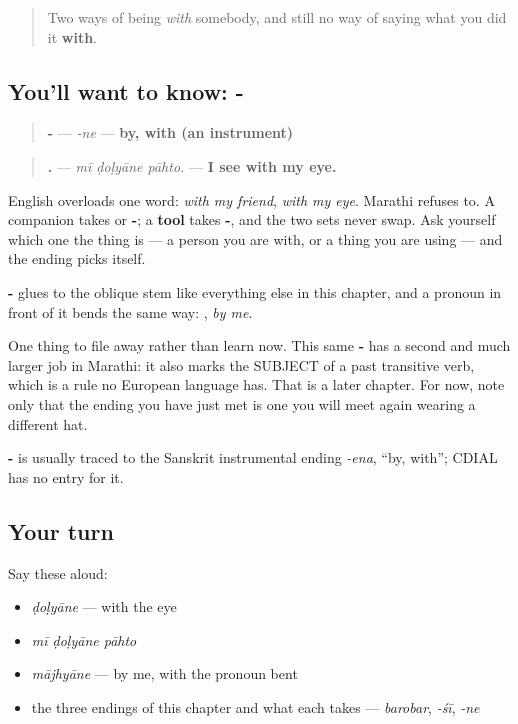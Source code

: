 \label{lesson:MR-C45-ne}



\begin{quote}
Two ways of being \emph{with} somebody, and still no way of saying what you did it \textbf{with}.
\end{quote}

\subsection*{You'll want to know: -}
\begin{quote}
\textbf{-} — \emph{-ne} — \textbf{by, with (an instrument)}
\end{quote}

\begin{quote}
\textbf{  .} — \emph{mī ḍoḷyāne pāhto.} — \textbf{I see with my eye.}
\end{quote}

English overloads one word: \emph{with my friend}, \emph{with my eye}. Marathi refuses to. A companion takes \textbf{} or \textbf{-}; a \textbf{tool} takes \textbf{-}, and the two sets never swap. Ask yourself which one the thing is — a person you are with, or a thing you are using — and the ending picks itself.

\textbf{-} glues to the oblique stem like everything else in this chapter, and a pronoun in front of it bends the same way: \textbf{}, \emph{by me}.

One thing to file away rather than learn now. This same \textbf{-} has a second and much larger job in Marathi: it also marks the SUBJECT of a past transitive verb, which is a rule no European language has. That is a later chapter. For now, note only that the ending you have just met is one you will meet again wearing a different hat.

\begin{cousinweb}
\textbf{-} is usually traced to the Sanskrit instrumental ending \emph{-ena}, \textquotedblleft{}by, with\textquotedblright{}; CDIAL has no entry for it.
\end{cousinweb}

\subsection*{Your turn}
Say these aloud:

\begin{itemize}
\raggedright
  \item \emph{ḍoḷyāne} — with the eye
  \item \emph{mī ḍoḷyāne pāhto}
  \item \emph{mājhyāne} — by me, with the pronoun bent
  \item the three endings of this chapter and what each takes — \emph{barobar}, \emph{-śī}, \emph{-ne}
\end{itemize}

